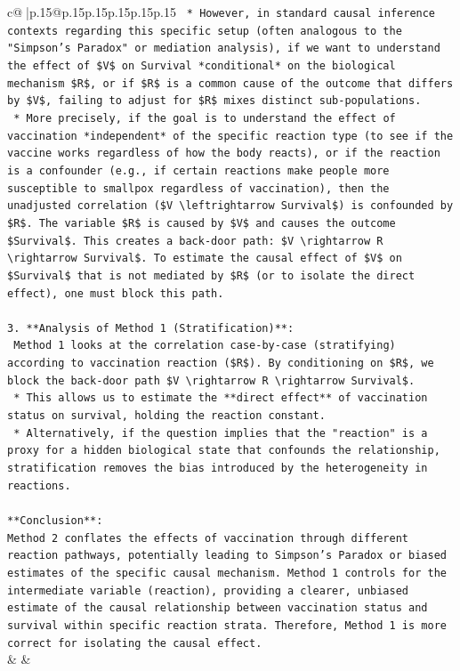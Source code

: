 \documentclass{article}
\begin{document}
{\begin{supertabular}{c@{$\;$}|p{.15\linewidth}@{}p{.15\linewidth}p{.15\linewidth}p{.15\linewidth}p{.15\linewidth}p{.15\linewidth}}
{{{\texttt{    *   However, in standard causal inference contexts regarding this specific setup (often analogous to the "Simpson's Paradox" or mediation analysis), if we want to understand the effect of \$V\$ on Survival *conditional* on the biological mechanism \$R\$, or if \$R\$ is a common cause of the outcome that differs by \$V\$, failing to adjust for \$R\$ mixes distinct sub{-}populations.} \\
\texttt{    *   More precisely, if the goal is to understand the effect of vaccination *independent* of the specific reaction type (to see if the vaccine works regardless of how the body reacts), or if the reaction is a confounder (e.g., if certain reactions make people more susceptible to smallpox regardless of vaccination), then the unadjusted correlation (\$V \textbackslash{}leftrightarrow Survival\$) is confounded by \$R\$. The variable \$R\$ is caused by \$V\$ and causes the outcome \$Survival\$. This creates a back{-}door path: \$V \textbackslash{}rightarrow R \textbackslash{}rightarrow Survival\$. To estimate the causal effect of \$V\$ on \$Survival\$ that is not mediated by \$R\$ (or to isolate the direct effect), one must block this path.} \\
\\ 
\texttt{3.  **Analysis of Method 1 (Stratification)**:} \\
\texttt{    Method 1 looks at the correlation case{-}by{-}case (stratifying) according to vaccination reaction (\$R\$). By conditioning on \$R\$, we block the back{-}door path \$V \textbackslash{}rightarrow R \textbackslash{}rightarrow Survival\$.} \\
\texttt{    *   This allows us to estimate the **direct effect** of vaccination status on survival, holding the reaction constant.} \\
\texttt{    *   Alternatively, if the question implies that the "reaction" is a proxy for a hidden biological state that confounds the relationship, stratification removes the bias introduced by the heterogeneity in reactions.} \\
\\ 
\texttt{**Conclusion**:} \\
\texttt{Method 2 conflates the effects of vaccination through different reaction pathways, potentially leading to Simpson's Paradox or biased estimates of the specific causal mechanism. Method 1 controls for the intermediate variable (reaction), providing a clearer, unbiased estimate of the causal relationship between vaccination status and survival within specific reaction strata. Therefore, Method 1 is more correct for isolating the causal effect.} \\
            }
        }
    }
    & & \\ \\


\end{supertabular}}
\end{document}

